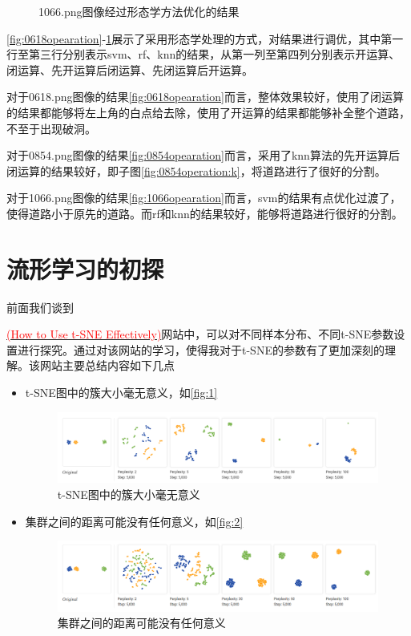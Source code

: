 \documentclass[12pt,hyperref,a4paper,UTF8]{ctexart}
\begin{document}
{\begin{figure}[!h]
	\caption{1066.png图像经过形态学方法优化的结果}
	\label{fig:1066opearation}
\end{figure}


\autoref{fig:0618opearation}-\ref{fig:1066opearation}展示了采用形态学处理的方式，对结果进行调优，其中第一行至第三行分别表示svm、rf、knn的结果，从第一列至第四列分别表示开运算、闭运算、先开运算后闭运算、先闭运算后开运算。
\par
对于0618.png图像的结果\autoref{fig:0618opearation}而言，整体效果较好，使用了闭运算的结果都能够将左上角的白点给去除，使用了开运算的结果都能够补全整个道路，不至于出现破洞。
\par
对于0854.png图像的结果\autoref{fig:0854opearation}而言，采用了knn算法的先开运算后闭运算的结果较好，即子图\ref{fig:0854operation:k}，将道路进行了很好的分割。
\par
对于1066.png图像的结果\autoref{fig:1066opearation}而言，svm的结果有点优化过渡了，使得道路小于原先的道路。而rf和knn的结果较好，能够将道路进行很好的分割。

\section{流形学习的初探}
前面我们谈到{\href{https://distill.pub/2016/misread-tsne}{\textcolor{red}{(How to Use t-SNE Effectively)}}网站中，可以对不同样本分布、不同t-SNE参数设置进行探究。通过对该网站的学习，使得我对于t-SNE的参数有了更加深刻的理解。该网站主要总结内容如下几点
\begin{itemize}
\item t-SNE图中的簇大小毫无意义，如\autoref{fig:1}
\begin{figure}
\centering
\includegraphics[width=.8\linewidth]{pic/1.png}
\caption{t-SNE图中的簇大小毫无意义}
\label{fig:1}
\end{figure}

\item 集群之间的距离可能没有任何意义，如\autoref{fig:2}
\begin{figure}
\centering
\includegraphics[width=.8\linewidth]{pic/2.png}
\caption{集群之间的距离可能没有任何意义}
\label{fig:2}
\end{figure}


\end{itemize}}}
\end{document}
